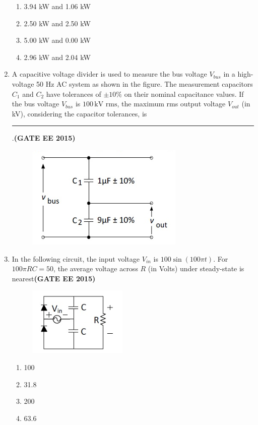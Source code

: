 \documentclass[a4paper,12pt]{exam}
\theoremstyle{remark}
\begin{document}
\begin{enumerate}
\begin{multicols}{2}
\begin{enumerate}
\item 3.94 kW and 1.06 kW
\item 2.50 kW and 2.50 kW
\item 5.00 kW and 0.00 kW
\item 2.96 kW and 2.04 kW
\end{enumerate}
\end{multicols}
\item A capacitive voltage divider is used to measure the bus voltage $V_{bus}$ in a high-voltage 50 Hz AC system as shown in the figure. 
The measurement capacitors $C_1$ and $C_2$ have tolerances of $\pm 10\%$ on their nominal capacitance values. 
If the bus voltage $V_{bus}$ is $100 \, \text{kV rms}$, the maximum rms output voltage $V_{out}$ (in kV), considering the capacitor tolerances, is\rule{3cm}{0.15mm}.\hfill{\textbf{(GATE EE 2015)}}
\begin{figure}[H]
    \centering
    \includegraphics[width=0.5\columnwidth]{figs/2Q 17.png}
    \caption{}
    \label{fig:placeholder}
\end{figure}

\item In the following circuit, the input voltage $V_{in}$ is $100 \sin(100 \pi t)$. 
For $100 \pi R C = 50$, the average voltage across $R$ (in Volts) under steady-state is nearest\hfill{\textbf{(GATE EE 2015)}}
\begin{figure}[H]
    \centering
    \includegraphics[width=0.5\columnwidth]{figs/2Q 18.png}
    \caption{}
    \label{fig:placeholder}
\end{figure}
\begin{multicols}{4}
\begin{enumerate}
\item 100
\item 31.8
\item 200
\item 63.6
\end{enumerate}
\end{multicols}


\end{enumerate}
\end{document}

